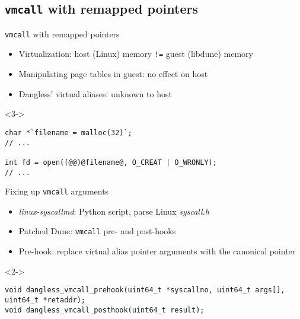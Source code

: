 \documentclass[10pt]{beamer}
\begin{document}
\subsection{\texttt{vmcall} with remapped pointers}

\begin{frame}[fragile]{\texttt{vmcall} with remapped pointers}
    \begin{itemize}
        \item Virtualization: host (Linux) memory \lstinline|!=| guest (libdune) memory
        \item<2-> Manipulating page tables in guest: no effect on host
        \item<3-> Dangless' virtual aliases: unknown to host
    \end{itemize}

    \begin{onlyenv}<3->
        \begin{lstlisting}
char *`filename = malloc(32)`;
// ...

int fd = open((@@)@filename@, O_CREAT | O_WRONLY);
// ...
        \end{lstlisting}
    \end{onlyenv}
\end{frame}

\begin{frame}[fragile]{Fixing up \texttt{vmcall} arguments}
    \begin{itemize}
        \item \emph{linux-syscallmd}: Python script, parse Linux \emph{syscall.h}
        \item<2-> Patched Dune: \lstinline!vmcall! pre- and post-hooks
        \item<3-> Pre-hook: replace virtual alias pointer arguments with the canonical pointer
    \end{itemize}
    
    \begin{onlyenv}<2->
        \begin{lstlisting}
void dangless_vmcall_prehook(uint64_t *syscallno, uint64_t args[], uint64_t *retaddr);
void dangless_vmcall_posthook(uint64_t result);
        \end{lstlisting}
    \end{onlyenv}
\end{frame}
\end{document}
